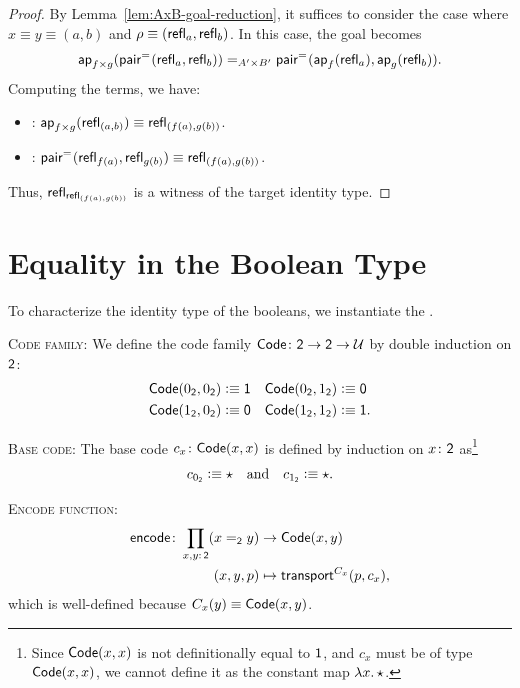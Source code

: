 \begin{proof}
    By Lemma~\ref{lem:AxB-goal-reduction}, it suffices to consider the case where\/ $x\equiv y\equiv(a,b)$ and\/ $\rho\equiv(\mathsf{refl}_a,\mathsf{refl}_b)$. In this case, the goal becomes
    \[
        \mathsf{ap}_{f\times g}(\mathsf{pair}^{\mathrel{=_{}}}
        (\mathsf{refl}_a,\mathsf{refl}_b))
        \mathrel{=_{A'\times B'}}
        \mathsf{pair}^{\mathrel{=_{}}}(\mathsf{ap}_f(\mathsf{refl}_a),\mathsf{ap}_g(\mathsf{refl}_b)).
    \]
    Computing the terms, we have:
    \begin{itemize}
        \item \lhs: $\mathsf{ap}_{f\times g}(\mathsf{refl}_{(a,b)}) \equiv \mathsf{refl}_{(f(a),g(b))}$.
        \item \rhs: $\mathsf{pair}^{\mathrel{=_{}}}(\mathsf{refl}_{f(a)}, \mathsf{refl}_{g(b)}) \equiv \mathsf{refl}_{(f(a),g(b))}$.
    \end{itemize}
    Thus, $\mathsf{refl}_{\mathsf{refl}_{(f(a),g(b))}}$ is a witness of the target identity type.
\end{proof}

\section{Equality in the Boolean Type}\label{equality-in-the-boolean-type}

To characterize the identity type of the booleans, we instantiate the .

\textsc{Code family:}
    We define the code family $\fun{Code}\colon\fun2\to\fun2\to\univ$ by double induction on $\mathsf{2}$:
    \begin{align*}
        \mathsf{Code}(0_{\mathsf{2}}, 0_{\mathsf{2}}) &\mathrel{\vcentcolon}\equiv \mathsf{1} & \mathsf{Code}(0_{\mathsf{2}}, 1_{\mathsf{2}}) &\mathrel{\vcentcolon}\equiv \mathsf{0} \\
        \mathsf{Code}(1_{\mathsf{2}}, 0_{\mathsf{2}}) &\mathrel{\vcentcolon}\equiv \mathsf{0} & \mathsf{Code}(1_{\mathsf{2}}, 1_{\mathsf{2}}) &\mathrel{\vcentcolon}\equiv \mathsf{1}.
    \end{align*}

\textsc{Base code:}
    The base code $c_x\colon\fun{Code}(x,x)$ is defined by induction on $x\colon\fun2$ as\footnote{Since $\mathsf{Code}(x,x)$ is not definitionally equal to $\mathsf{1}$, and $c_x$ must be of type $\mathsf{Code}(x,x)$, we cannot define it as the constant map $\lambda x.\,\mathsf{\star}$.}
    \[
        c_{0_{\mathsf{2}}} \mathrel{\vcentcolon}\equiv \mathsf{\star}\quad\text{and}\quad c_{1_{\mathsf{2}}} \mathrel{\vcentcolon}\equiv \mathsf{\star}.
    \]

\textsc{Encode function:}
    \begin{align*}
        \fun{encode}\colon\prod_{x,y\colon\fun2}(x\eq{\fun2}y)
            &\to\fun{Code}(x,y)\\
        (x,y,p)&\mapsto\fun{transport}^{C_x}(p,c_x),
    \end{align*}
    which is well-defined because $C_x(y)\equiv\mathsf{Code}(x,y)$.

